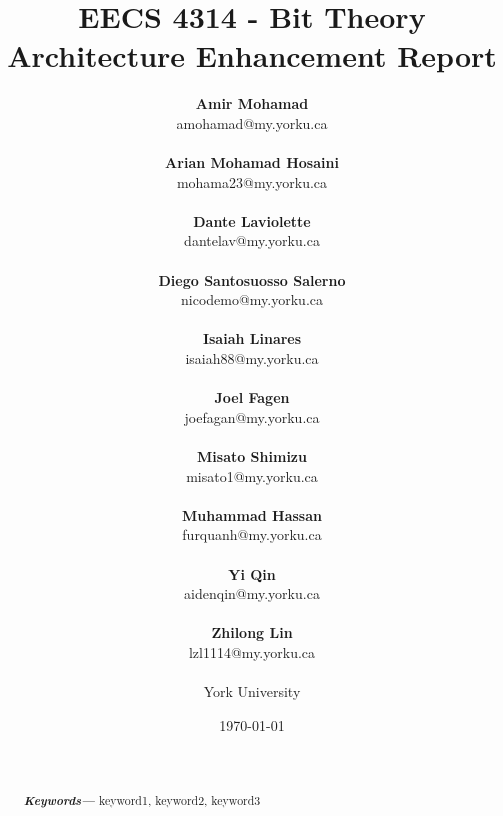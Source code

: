 \documentclass[12pt, dvipsnames, a4paper]{article}
\providecommand{\keywords}[1]
{
  \small	
  \textbf{\textit{Keywords---}} #1
}
\begin{document}
\title{\textbf{EECS 4314 - Bit Theory\\Architecture Enhancement Report}}
\date{\Large \today}
\author{
	\large \textbf{Amir Mohamad}\\ \small amohamad@my.yorku.ca\\\\
	\large \textbf{Arian Mohamad Hosaini}\\ \small mohama23@my.yorku.ca\\\\
	\large \textbf{Dante Laviolette}\\ \small dantelav@my.yorku.ca\\\\
	\large \textbf{Diego Santosuosso Salerno}\\ \small nicodemo@my.yorku.ca\\\\
	\large \textbf{Isaiah Linares}\\ \small isaiah88@my.yorku.ca\\\\
	\large \textbf{Joel Fagen}\\ \small joefagan@my.yorku.ca\\\\
	\large \textbf{Misato Shimizu}\\ \small misato1@my.yorku.ca\\\\
	\large \textbf{Muhammad Hassan}\\ \small furquanh@my.yorku.ca\\\\
	\large \textbf{Yi Qin}\\ \small aidenqin@my.yorku.ca\\\\
	\large \textbf{Zhilong Lin}\\ \small lzl1114@my.yorku.ca\\\\
	\large York University\\
}
\maketitle
\newpage
\hspace{0pt}
\vfill
\begin{abstract}
	\lipsum[1]
	\lipsum[1]
	\\\\
	\keywords{keyword1, keyword2, keyword3}
\end{abstract}
\vfill
\hspace{0pt}
\newpage
\tableofcontents
\clearpage
\end{document}

